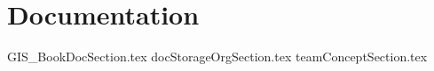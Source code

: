 \documentclass[class=book , crop=false]{standalone}
\begin{document}
\chapter{Documentation}

{GIS_BookDocSection.tex}
\clearpage %
{docStorageOrgSection.tex}
\clearpage
{teamConceptSection.tex}
\clearpage
\end{document}
